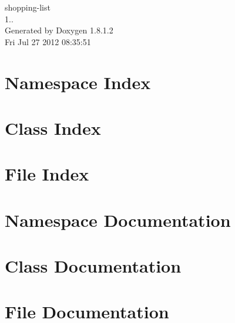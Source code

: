 \documentclass{book}
\begin{document}
\hypersetup{pageanchor=false,citecolor=blue}
\begin{titlepage}
\vspace*{7cm}
\begin{center}
{\Large shopping-\/list \\[1ex]\large 1.. }\\
\vspace*{1cm}
{\large Generated by Doxygen 1.8.1.2}\\
\vspace*{0.5cm}
{\small Fri Jul 27 2012 08:35:51}\\
\end{center}
\end{titlepage}
\clearemptydoublepage
{}
\tableofcontents
\clearemptydoublepage
{}
\hypersetup{pageanchor=true,citecolor=blue}
\chapter{Namespace Index}

\chapter{Class Index}

\chapter{File Index}

\chapter{Namespace Documentation}



\chapter{Class Documentation}





\chapter{File Documentation}





\printindex
\end{document}
